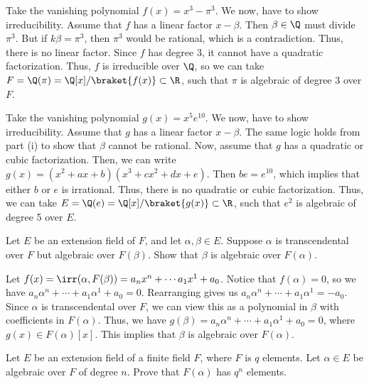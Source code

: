 \begin{solution}[(i)]
  Take the vanishing polynomial $f(x) = x^3 - \pi^3$. We now, have to show irreducibility. Assume that $f$ has a linear factor $x - \beta$. Then $\beta \in \Q$ must divide $\pi^3$. But if $k\beta = \pi^3$, then $\pi^3$ would be rational, which is a contradiction. Thus, there is no linear factor. Since $f$ has degree 3, it cannot have a quadratic factorization. Thus, $f$ is irreducible over $\Q$, so we can take $F = \Q(\pi) = \Q[x]/\braket{f(x)} \subset \R$, such that $\pi$ is algebraic of degree 3 over $F$.
\end{solution}

\begin{solution}[(ii)]
  Take the vanishing polynomial $g(x) = x^5 e^{10}$. We now, have to show irreducibility. Assume that $g$ has a linear factor $x - \beta$. The same logic holds from part (i) to show that $\beta$ cannot be rational. Now, assume that $g$ has a quadratic or cubic factorization. Then, we can write $g(x) = (x^2 + ax + b)(x^3 + cx^2 + dx + e)$. Then $be = e^{10}$, which implies that either $b$ or $e$ is irrational. Thus, there is no quadratic or cubic factorization. Thus, we can take $E = \Q(e) = \Q[x]/\braket{g(x)} \subset \R$, such that $e^2$ is algebraic of degree 5 over $E$.
\end{solution}

\begin{problem}[39.29]
  Let $E$ be an extension field of $F$, and let $\alpha, \beta \in E$. Suppose $\alpha$ is transcendental over $F$ but algebraic over $F(\beta)$. Show that $\beta$ is algebraic over $F(\alpha)$.
\end{problem}

\begin{solution}
  Let $f(x) = \irr(\alpha, F(\beta)) = a_nx^n + \cdots a_1x^1 + a_0$. Notice that $f(\alpha) = 0$, so we have $a_n\alpha^n + \cdots + a_1\alpha^1 + a_0 = 0$. Rearranging gives us $a_n\alpha^n + \cdots + a_1\alpha^1 = -a_0$. Since $\alpha$ is transcendental over $F$, we can view this as a polynomial in $\beta$ with coefficients in $F(\alpha)$. Thus, we have $g(\beta) = a_n\alpha^n + \cdots + a_1\alpha^1 + a_0 = 0$, where $g(x) \in F(\alpha)[x]$. This implies that $\beta$ is algebraic over $F(\alpha)$.
\end{solution}

\begin{problem}[39.30]
  Let $E$ be an extension field of a finite field $F$, where $F$ is $q$ elements. Let $\alpha \in E$ be algebraic over $F$ of degree $n$. Prove that $F(\alpha)$ has $q^n$ elements.
\end{problem}

